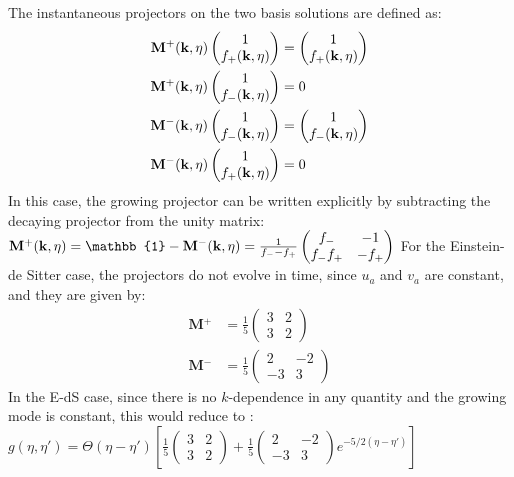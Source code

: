 The instantaneous projectors on the two basis solutions are defined
as:
\begin{align*}
\mathrm{\mathbf{M}}{}^{+}(\mathbf{k},\eta)\begin{pmatrix}1\\
f_{+}(\mathbf{k},\eta)
\end{pmatrix} & =\begin{pmatrix}1\\
f_{+}(\mathbf{k},\eta)
\end{pmatrix}\\
\mathrm{\mathbf{M}}{}^{+}(\mathbf{k},\eta)\begin{pmatrix}1\\
f_{-}(\mathbf{k},\eta)
\end{pmatrix} & =0\\
\mathbf{\mathrm{\mathbf{M}}}^{-}(\mathbf{k},\eta)\begin{pmatrix}1\\
f_{-}(\mathbf{k},\eta)
\end{pmatrix} & =\begin{pmatrix}1\\
f_{-}(\mathbf{k},\eta)
\end{pmatrix}\\
\mathrm{\mathbf{M}}^{-}(\mathbf{k},\eta)\begin{pmatrix}1\\
f_{+}(\mathbf{k},\eta)
\end{pmatrix} & =0
\end{align*}
In this case, the growing projector can be written explicitly by subtracting the
decaying projector from the unity matrix:
\beeqp$ 
\mathrm{\mathbf{M}}{}^{+}\pkn=\mathbb{1}-\mathrm{\mathbf{M}}{}^{-}\pkn=\frac{1}{f_{-}-f_{+}}\begin{pmatrix}f_{-} & -1\\
f_{-}f_{+} & -f_{+}
\end{pmatrix}
$
For the Einstein-de Sitter case, the projectors do not evolve in time,
since $u_{a}$ and $v_{a}$ are constant, and they are given by: 
\begin{align*}
\mathrm{\mathbf{M}}{}^{+} & =\frac{1}{5}\begin{pmatrix}3 & 2\\
3 & 2
\end{pmatrix}\\
\mathrm{\mathbf{M}}{}^{-} & =\frac{1}{5}\begin{pmatrix}2 & -2\\
-3 & 3
\end{pmatrix}
\end{align*}
In the E-dS case, since there is no $k$-dependence
in any quantity and the growing mode is constant, this would reduce to :
\beeqp$ 
g(\eta,\eta')=\Theta(\eta-\eta')\left[\frac{1}{5}\begin{pmatrix}3 & 2\\
3 & 2
\end{pmatrix}+\frac{1}{5}\begin{pmatrix}2 & -2\\
-3 & 3
\end{pmatrix}e^{-5/2(\eta-\eta')}\right]
$



